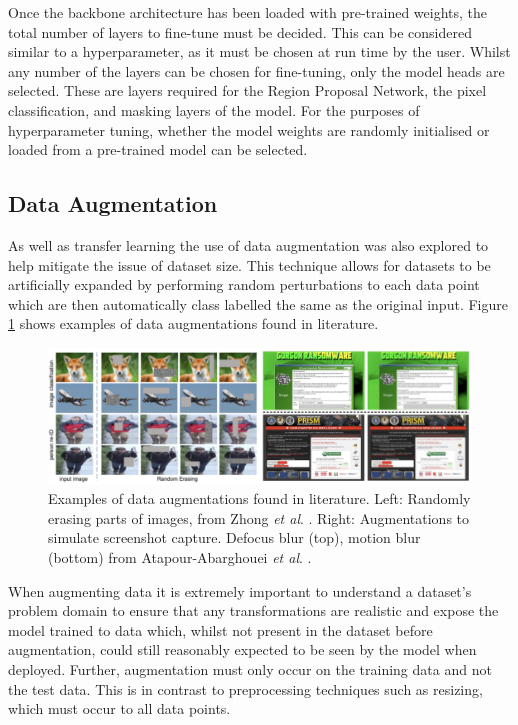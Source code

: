 Once the backbone architecture has been loaded with pre-trained weights, the total number of layers to fine-tune must be decided. This can be considered similar to a hyperparameter, as it must be chosen at run time by the user. Whilst any number of the layers can be chosen for fine-tuning, only the model heads are selected. These are layers required for the Region Proposal Network, the pixel classification, and masking layers of the model. For the purposes of hyperparameter tuning, whether the model weights are randomly initialised or loaded from a pre-trained model can be selected.

\subsection{Data Augmentation}\label{ch:cetDet,sec:initialTesting,sub:dataaugmentation}

As well as transfer learning the use of data augmentation was also explored to help mitigate the issue of dataset size. This technique allows for datasets to be artificially expanded by performing random perturbations to each data point which are then automatically class labelled the same as the original input. Figure \ref{fig:data-aug-examples} shows examples of data augmentations found in literature.

\begin{figure}[h]
	\begin{center}
		\includegraphics[scale=0.45]{Chapter3/figs/data-augs.png}
	\end{center}
	\caption{Examples of data augmentations found in literature. Left: Randomly erasing parts of images, from Zhong \textit{et al}. \cite{zhong_random_2017}. Right: Augmentations to simulate screenshot capture. Defocus blur (top), motion blur (bottom) from Atapour-Abarghouei \textit{et al}. \cite{atapour-abarghouei_kings_2019}.}
	\label{fig:data-aug-examples}
\end{figure}

When augmenting data it is extremely important to understand a dataset's problem domain to ensure that any transformations are realistic and expose the model trained to data which, whilst not present in the dataset before augmentation, could still reasonably expected to be seen by the model when deployed. Further, augmentation must only occur on the training data and not the test data. This is in contrast to preprocessing techniques such as resizing, which must occur to all data points. 

